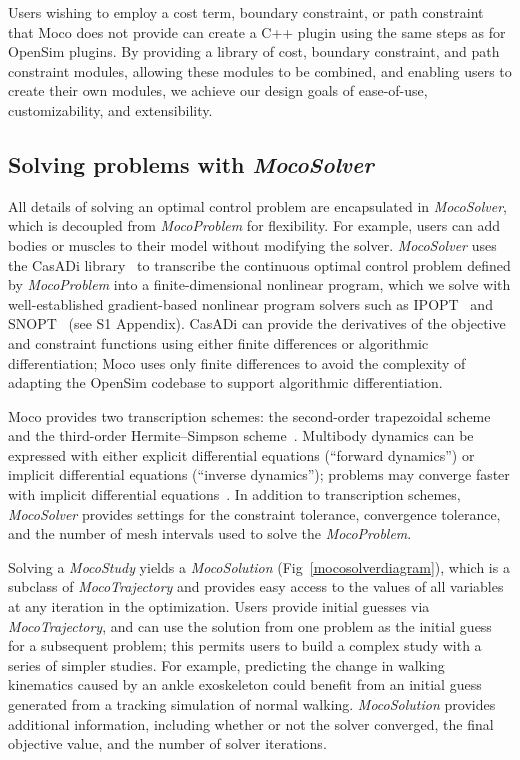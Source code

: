 \documentclass[10pt,letterpaper]{article}
\begin{document}
Users wishing to employ a cost term, boundary constraint, or path constraint that Moco does not provide can create a C++ plugin using the same steps as for OpenSim plugins. By providing a library of cost, boundary constraint, and path constraint modules, allowing these modules to be combined, and enabling users to create their own modules, we achieve our design goals of ease-of-use, customizability, and extensibility.

\subsection*{Solving problems with \textit{MocoSolver}}

All details of solving an optimal control problem are encapsulated in \textit{MocoSolver}, which is decoupled from \textit{MocoProblem} for flexibility. For example, users can add bodies or muscles to their model without modifying the solver. \textit{MocoSolver} uses the CasADi library~\cite{Andersson:2019} to transcribe the continuous optimal control problem defined by \textit{MocoProblem} into a finite-dimensional nonlinear program, which we solve with well-established gradient-based nonlinear program solvers such as IPOPT~\cite{Wachter:2006} and SNOPT~\cite{Gill:2005} (see S1 Appendix). CasADi can provide the derivatives of the objective and constraint functions using either finite differences or algorithmic differentiation; Moco uses only finite differences to avoid the complexity of adapting the OpenSim codebase to support algorithmic differentiation.

Moco provides two transcription schemes: the second-order trapezoidal scheme and the third-order Hermite--Simpson scheme~\cite{Betts:2010}. Multibody dynamics can be expressed with either explicit differential equations (``forward dynamics'') or implicit differential equations (``inverse dynamics''); problems may converge faster with implicit differential equations~\cite{vandenBogert:2011fv,Groote:2016dq}. In addition to transcription schemes, \textit{MocoSolver} provides settings for the constraint tolerance, convergence tolerance, and the number of mesh intervals used to solve the \textit{MocoProblem}.

Solving a \textit{MocoStudy} yields a \textit{MocoSolution} (Fig~\ref{mocosolverdiagram}), which is a subclass of \textit{MocoTrajectory} and provides easy access to the values of all variables at any iteration in the optimization. Users provide initial guesses via \textit{MocoTrajectory}, and can use the solution from one problem as the initial guess for a subsequent problem; this permits users to build a complex study with a series of simpler studies. For example, predicting the change in walking kinematics caused by an ankle exoskeleton could benefit from an initial guess generated from a tracking simulation of normal walking. \textit{MocoSolution} provides additional information, including whether or not the solver converged, the final objective value, and the number of solver iterations.
\end{document}

